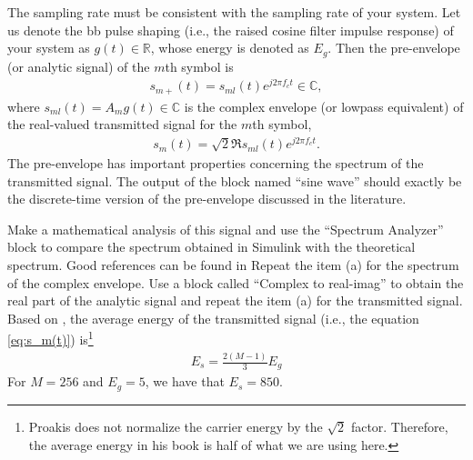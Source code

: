 \documentclass[12pt,a4paper]{article}
\begin{document}
The sampling rate must be consistent with the sampling rate of your system. Let us denote the \gls{bb} pulse shaping (i.e., the raised cosine filter impulse response) of your system as \(g\left( t \right) \in \mathbb{R}\), whose energy is denoted as \(E_g\). Then the pre-envelope (or analytic signal) of the \(m\)th symbol is
\begin{align}
    s_{m+}\left( t \right) = s_{ml}\left( t \right) e^{j 2\pi f_c t} \in \mathbb{C},
\end{align}
where \(s_{ml}\left( t \right) = A_m g\left( t \right) \in \mathbb{C}\) is the complex envelope (or lowpass equivalent) of the real-valued transmitted signal for the \(m\)th symbol,
\begin{align}
    \label{eq:s_m(t)}
    s_{m}\left( t \right) = \sqrt{2} \Re{s_{ml}\left( t \right) e^{j 2\pi f_c t}}.
\end{align}
The pre-envelope has important properties concerning the spectrum of the transmitted signal. The output of the block named ``sine wave'' should exactly be the discrete-time version of the pre-envelope discussed in the literature.

\subproblem Make a mathematical analysis of this signal and use the ``Spectrum Analyzer'' block to compare the spectrum obtained in Simulink with the theoretical spectrum. Good references can be found in \cite{mengaliSynchronizationTechniquesDigital1997,meyrDigitalCommunicationReceivers1998,proakisDigitalCommunications2007}
\subproblem Repeat the item (a) for the spectrum of the complex envelope.
\subproblem Use a block called ``Complex to real-imag'' to obtain the real part of the analytic signal and repeat the item (a) for the transmitted signal.
\subproblem Based on \cite[Equation (3.2-42)]{proakisDigitalCommunications2007}, the average energy of the transmitted signal (i.e., the equation \eqref{eq:s_m(t)}) is\footnote{Proakis does not normalize the carrier energy by the \(\sqrt{2}\) factor. Therefore, the average energy in his book is half of what we are using here.}
\begin{align}
    E_s = \frac{2\left( M-1 \right)}{3}E_g
\end{align}
For \(M = 256\) and \(E_g = 5\), we have that \(E_s = 850\).



\printbibliography
\end{document}
